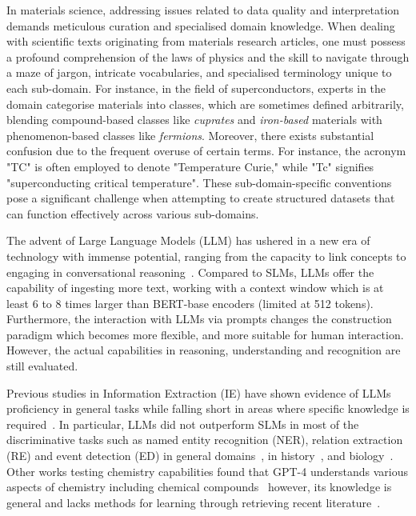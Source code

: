 \documentclass[a4paper]{article}
\begin{document}
In materials science, addressing issues related to data quality and interpretation demands meticulous curation and specialised domain knowledge.
When dealing with scientific texts originating from materials research articles, one must possess a profound comprehension of the laws of physics and the skill to navigate through a maze of jargon, intricate vocabularies, and specialised terminology unique to each sub-domain. 
For instance, in the field of superconductors, experts in the domain categorise materials into classes, which are sometimes defined arbitrarily, blending compound-based classes like \textit{cuprates} and \textit{iron-based} materials with phenomenon-based classes like \textit{fermions}. 
Moreover, there exists substantial confusion due to the frequent overuse of certain terms. For instance, the acronym "TC" is often employed to denote "Temperature Curie," while "Tc" signifies "superconducting critical temperature". 
These sub-domain-specific conventions pose a significant challenge when attempting to create structured datasets that can function effectively across various sub-domains.

The advent of Large Language Models (LLM) has ushered in a new era of technology with immense potential, ranging from the capacity to link concepts to engaging in conversational reasoning~\cite{zhang2023one,yao2023tree,valmeekam2023planning,sun2023pearl}.
Compared to SLMs, LLMs offer the capability of ingesting more text, working with a context window which is at least 6 to 8 times larger than BERT-base encoders (limited at 512 tokens). 
Furthermore, the interaction with LLMs via prompts changes the construction paradigm which becomes more flexible, and more suitable for human interaction. 
However, the actual capabilities in reasoning, understanding and recognition are still evaluated.

Previous studies in Information Extraction (IE) have shown evidence of LLMs proficiency in general tasks while falling short in areas where specific knowledge is required~\cite{kokon2023chatgpt}. 
In particular, LLMs did not outperform SLMs in most of the discriminative tasks such as named entity recognition (NER), relation extraction (RE) and event detection (ED) in general domains~\cite{ma2023large}, in history~\cite{gonzalez2023yes}, and biology~\cite{moradi2022gpt3}.
Other works testing chemistry capabilities found that GPT-4 understands various aspects of chemistry including chemical compounds~\cite{hatakeyama2023prompt} however, its knowledge is general and lacks methods for learning through retrieving recent literature~\cite{hatakeyama2023using}.
\end{document}
